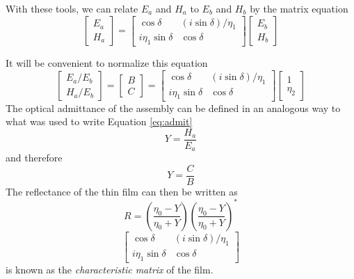 \documentclass{article}
\begin{document}
    With these tools, we can relate $E_a$ and $H_a$ to $E_b$ and $H_b$ by the matrix equation
    \begin{equation}
        \label{eq:charmatrix}
        \begin{bmatrix}
            E_a \\
            H_a
        \end{bmatrix}
        =
        \begin{bmatrix}
            \cos \delta & (i \sin \delta)/\eta_1 \\
            i \eta_1 \sin \delta & \cos \delta
        \end{bmatrix}
        \begin{bmatrix}
            E_b \\
            H_b
        \end{bmatrix}        
    \end{equation}
    
    It will be convenient to normalize this equation
    \begin{equation}
        \begin{bmatrix}
            E_a/E_b \\
            H_a/E_b
        \end{bmatrix}
        =
        \begin{bmatrix}
            B \\
            C
        \end{bmatrix}
        =
        \begin{bmatrix}
            \cos \delta & (i \sin \delta)/\eta_1 \\
            i \eta_1 \sin \delta & \cos \delta
        \end{bmatrix}
        \begin{bmatrix}
            1 \\
            \eta_2
        \end{bmatrix}        
    \end{equation}
    The optical admittance of the assembly can be defined in an analogous way to what was used to write Equation \ref{eq:admit}
    \begin{equation}
        Y = \frac{H_a}{E_a} 
    \end{equation}
    and therefore
    \begin{equation}
        Y = \frac{C}{B} \label{eq:filmadmit}
    \end{equation}
    The reflectance of the thin film can then be written as
    \begin{equation}
        R = \left(\frac{\eta_0 - Y}{\eta_0 + Y}\right)\left(\frac{\eta_0 - Y}{\eta_0 + Y}\right)^* \label{eq:filmreflec}
    \end{equation}
    \begin{equation*}
        \begin{bmatrix}
            \cos \delta & (i \sin \delta)/\eta_1 \\
            i \eta_1 \sin \delta & \cos \delta
        \end{bmatrix}
    \end{equation*}
    is known as the \emph{characteristic matrix} of the film.   
\end{document}
